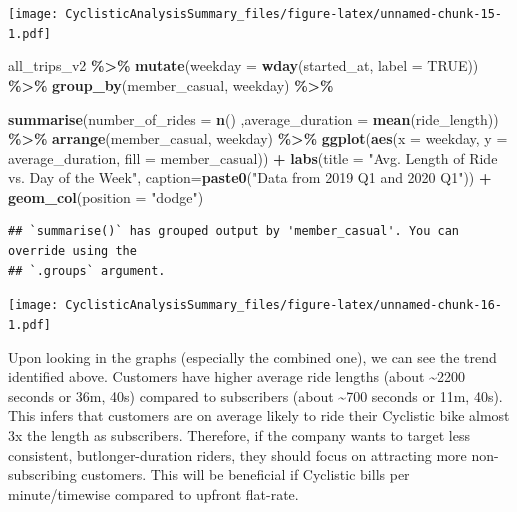 \documentclass[
]{article}
\newenvironment{Shaded}{\begin{snugshade}}{\end{snugshade}}
\newcommand{\AttributeTok}[1]{\textcolor[rgb]{0.13,0.29,0.53}{#1}}
\newcommand{\ConstantTok}[1]{\textcolor[rgb]{0.56,0.35,0.01}{#1}}
\newcommand{\FunctionTok}[1]{\textcolor[rgb]{0.13,0.29,0.53}{\textbf{#1}}}
\newcommand{\NormalTok}[1]{#1}
\newcommand{\SpecialCharTok}[1]{\textcolor[rgb]{0.81,0.36,0.00}{\textbf{#1}}}
\newcommand{\StringTok}[1]{\textcolor[rgb]{0.31,0.60,0.02}{#1}}
\begin{document}
\texttt{[image: CyclisticAnalysisSummary\_files/figure-latex/unnamed-chunk-15-1.pdf]}

\begin{Shaded}
\begin{Highlighting}[]
\NormalTok{all\_trips\_v2 }\SpecialCharTok{\%\textgreater{}\%}
  \FunctionTok{mutate}\NormalTok{(}\AttributeTok{weekday =} \FunctionTok{wday}\NormalTok{(started\_at, }\AttributeTok{label =} \ConstantTok{TRUE}\NormalTok{)) }\SpecialCharTok{\%\textgreater{}\%}
  \FunctionTok{group\_by}\NormalTok{(member\_casual, weekday) }\SpecialCharTok{\%\textgreater{}\%}
  
  \FunctionTok{summarise}\NormalTok{(}\AttributeTok{number\_of\_rides =} \FunctionTok{n}\NormalTok{()}
\NormalTok{            ,}\AttributeTok{average\_duration =} \FunctionTok{mean}\NormalTok{(ride\_length)) }\SpecialCharTok{\%\textgreater{}\%}
  \FunctionTok{arrange}\NormalTok{(member\_casual, weekday) }\SpecialCharTok{\%\textgreater{}\%}
  \FunctionTok{ggplot}\NormalTok{(}\FunctionTok{aes}\NormalTok{(}\AttributeTok{x =}\NormalTok{ weekday, }\AttributeTok{y =}\NormalTok{ average\_duration, }\AttributeTok{fill =}\NormalTok{ member\_casual)) }\SpecialCharTok{+}
  \FunctionTok{labs}\NormalTok{(}\AttributeTok{title =} \StringTok{"Avg. Length of Ride vs. Day of the Week"}\NormalTok{,}
       \AttributeTok{caption=}\FunctionTok{paste0}\NormalTok{(}\StringTok{"Data from 2019 Q1 and 2020 Q1"}\NormalTok{)) }\SpecialCharTok{+}
  \FunctionTok{geom\_col}\NormalTok{(}\AttributeTok{position =} \StringTok{"dodge"}\NormalTok{)}
\end{Highlighting}
\end{Shaded}

\begin{verbatim}
## `summarise()` has grouped output by 'member_casual'. You can override using the
## `.groups` argument.
\end{verbatim}

\texttt{[image: CyclisticAnalysisSummary\_files/figure-latex/unnamed-chunk-16-1.pdf]}

Upon looking in the graphs (especially the combined one), we can see the
trend identified above. Customers have higher average ride lengths
(about \textasciitilde2200 seconds or 36m, 40s) compared to subscribers
(about \textasciitilde700 seconds or 11m, 40s). This infers that
customers are on average likely to ride their Cyclistic bike almost 3x
the length as subscribers. Therefore, if the company wants to target
less consistent, butlonger-duration riders, they should focus on
attracting more non-subscribing customers. This will be beneficial if
Cyclistic bills per minute/timewise compared to upfront flat-rate.
\end{document}
